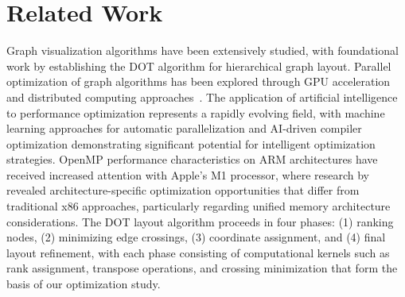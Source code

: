 \section{Related Work}
\label{sec:related}

Graph visualization algorithms have been extensively studied, with foundational 
work by \cite{gansner1993technique} establishing the DOT algorithm for 
hierarchical graph layout. Parallel optimization of graph algorithms has been 
explored through GPU acceleration~\cite{merrill2012scalable} and distributed computing approaches~\cite{shun2013ligra}. The application of artificial intelligence to 
performance optimization represents a rapidly evolving field, with machine 
learning approaches for automatic parallelization \cite{cummins2017end} and 
AI-driven compiler optimization \cite{ashouri2018survey} demonstrating 
significant potential for intelligent optimization strategies. OpenMP 
performance characteristics on ARM architectures have received increased 
attention with Apple's M1 processor, where research by 
\cite{jin2011high} revealed architecture-specific optimization 
opportunities that differ from traditional x86 approaches, particularly 
regarding unified memory architecture considerations. The DOT layout algorithm 
\cite{gansner1993technique} proceeds in four phases: (1) ranking nodes, 
(2) minimizing edge crossings, (3) coordinate assignment, and (4) final layout 
refinement, with each phase consisting of computational kernels such as rank 
assignment, transpose operations, and crossing minimization that form the basis 
of our optimization study.